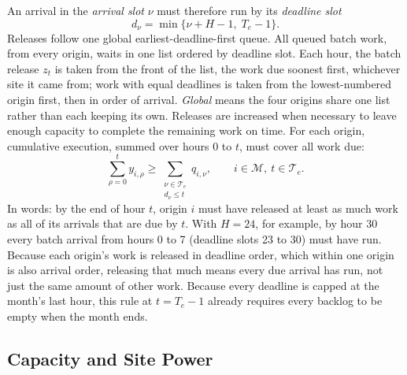 \documentclass{UNCC-thesis}
\begin{document}
An arrival in the \emph{arrival slot} \(\nu\) must therefore run by its
\emph{deadline slot}
\begin{equation}
  d_{\nu}
  =
  \min\{\nu+H-1,\;T_e-1\}.
  \label{eq:batch-deadline}
\end{equation}
Releases follow one global earliest-deadline-first queue. All queued batch
work, from every origin, waits in one list ordered by deadline slot. Each
hour, the batch release \(z_t\) is taken from the front of the list, the work
due soonest first, whichever site it came from; work with equal deadlines is
taken from the lowest-numbered origin first, then in order of arrival.
\emph{Global} means the four origins share one list rather than each keeping
its own. Releases are increased when necessary to leave enough capacity to
complete the remaining work on time. For each
origin, cumulative execution, summed over hours 0 to \(t\),
must cover all work due:
\begin{equation}
  \sum_{\rho=0}^{t}y_{i,\rho}
  \geq
  \sum_{\substack{\nu\in\mathcal T_e\\d_{\nu}\leq t}}q_{i,\nu},
  \qquad i\in\mathcal M,\ t\in\mathcal T_e.
  \label{eq:deadline-feasibility}
\end{equation}
In words: by the end of hour \(t\), origin \(i\) must have released at least
as much work as all of its arrivals that are due by \(t\). With \(H=24\), for
example, by hour 30 every batch arrival from hours 0 to 7 (deadline slots 23
to 30) must have run. Because each origin's work is released in deadline
order, which within one origin is also arrival order, releasing that much
means every due arrival has run, not just the same amount of other work.
Because every deadline is capped at the month's last hour, this rule at
\(t=T_e-1\) already requires every backlog to be empty when the month
ends.

\subsection{Capacity and Site Power}
\label{subsec:problem-feasibility}
\end{document}
